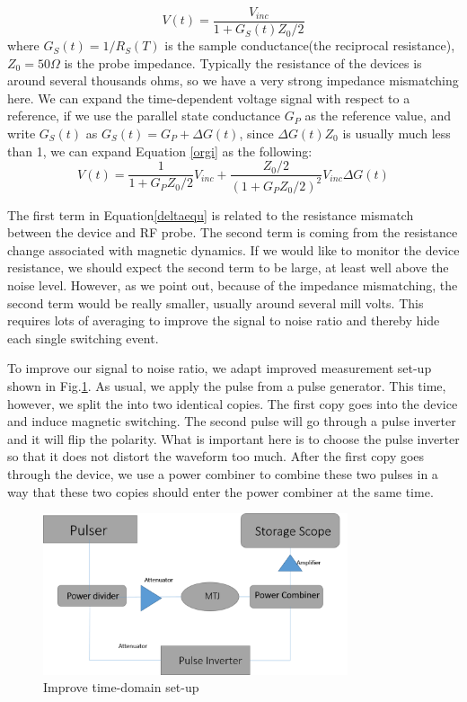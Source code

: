 \begin{equation}
\label{orgi}
V(t) = \frac{V_{inc}}{1+G_S(t)Z_0/2}
\end{equation}
where $G_S(t) = 1/ R_S(T)$ is the sample conductance(the reciprocal resistance), $Z_0=50 \Omega$ is the probe impedance. Typically the resistance of the devices is around several thousands ohms, so we have a very strong impedance mismatching here. We can expand the time-dependent voltage signal with respect to a reference, if we use the parallel state conductance $G_P$ as the reference value, and write $G_S(t)$ as $G_S(t) = G_P + \Delta G(t)$, since $\Delta G(t) Z_0$ is usually much less than 1, we can expand Equation \ref{orgi} as the following:
\begin{equation}
\label{deltaequ}
V(t) = \frac{1}{1+G_PZ_0/2}V_{inc} + \frac{Z_0/2}{(1+G_PZ_0/2)^2}V_{inc} \Delta G(t)
\end{equation}

The first term in Equation\ref{deltaequ} is related to the resistance mismatch between the device and RF probe. The second term is coming from the resistance change associated with magnetic dynamics. If we would like to monitor the device resistance, we should expect the second term to be large, at least well above the noise level. However, as we point out, because of the impedance mismatching, the second term would be really smaller, usually around several mill volts. This requires lots of averaging to improve the signal to noise ratio and thereby hide each single switching event.

To improve our signal to noise ratio, we adapt improved measurement set-up shown in Fig.\ref{fig:time_domain}. As usual, we apply the pulse from a pulse generator. This time, however, we split the into two identical copies. The first copy goes into the device and induce magnetic switching. The second pulse will go through a pulse inverter and it will flip the polarity. What is important here is to choose the pulse inverter so that it does not distort the waveform too much. After the first copy goes through the device, we use a power combiner to combine these two pulses in a way that these two copies should enter the power combiner at the same time. 

\begin{figure}[h]
  \centering
  \includegraphics[width=0.8\textwidth]{fig/time_domain}
  \caption{Improve time-domain set-up}
  \label{fig:time_domain}
\end{figure}

